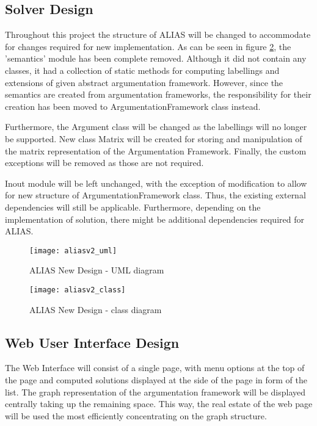 \subsection{Solver Design}
Throughout this project the structure of ALIAS will be changed to accommodate for changes required for new implementation. As can be seen in figure \ref{fig:aliasUml2}, the 'semantics' module has been complete removed. Although it did not contain any classes, it had a collection of static methods for computing labellings and extensions of given abstract argumentation framework. However, since the semantics are created from argumentation frameworks, the responsibility for their creation has been moved to ArgumentationFramework class instead. 

Furthermore, the Argument class will be changed as the labellings will no longer be supported. New class Matrix will be created for storing and manipulation of the matrix representation of the Argumentation Framework. Finally, the custom exceptions will be removed as those are not required.

Inout module will be left unchanged, with the exception of modification to allow for new structure of ArgumentationFramework class. Thus, the existing external dependencies will still be applicable. Furthermore, depending on the implementation of solution, there might be additional dependencies required for ALIAS.

\begin{figure}[h]
	\texttt{[image: aliasv2\_uml]}
	\caption{ALIAS New Design - UML diagram}
	\label{fig:aliasUml2}
\end{figure}

\begin{figure}[h]
	\texttt{[image: aliasv2\_class]}
	\caption{ALIAS New Design - class diagram}
	\label{fig:aliasUml2}
\end{figure}

\subsection{Web User Interface Design}
The Web Interface will consist of a single page, with menu options at the top of the page and computed solutions displayed at the side of the page in form of the list. The graph representation of the argumentation framework will be displayed centrally taking up the remaining space. This way, the real estate of the web page will be used the most efficiently concentrating on the graph structure. 

